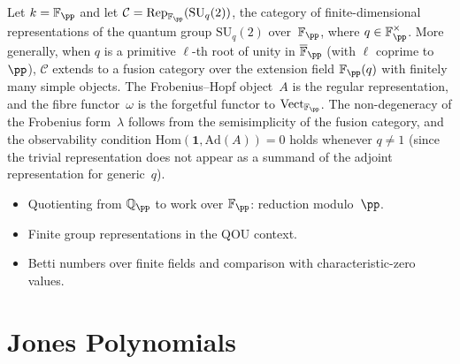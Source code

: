 \begin{example}
\label{ex:finite-field-realisation}
Let $k = \mathbb{F}_\pp$ and let $\mathcal{C} =
\mathrm{Rep}_{\mathbb{F}_\pp}(\mathrm{SU}_q(2))$, the category of
finite-dimensional representations of the quantum group
$\mathrm{SU}_q(2)$ over~$\mathbb{F}_\pp$, where $q \in
\mathbb{F}_\pp^{\times}$.  More generally, when $q$ is a primitive
$\ell$-th root of unity in $\overline{\mathbb{F}}_\pp$ (with $\ell$
coprime to~$\pp$), $\mathcal{C}$ extends to a fusion category over the
extension field $\mathbb{F}_\pp(q)$ with finitely many simple objects.
The Frobenius--Hopf object~$A$ is the regular representation, and
the fibre functor~$\omega$ is the forgetful functor to
$\mathrm{Vect}_{\mathbb{F}_\pp}$.  The non-degeneracy of the
Frobenius form~$\lambda$ follows from the semisimplicity of the fusion
category, and the observability condition
$\mathrm{Hom}(\mathbf{1}, \mathrm{Ad}(A)) = 0$ holds whenever $q \neq 1$
(since the trivial representation does not appear as a summand of the
adjoint representation for generic~$q$).
\end{example}

\begin{itemize}
  \item Quotienting from $\mathbb{Q}_\pp$ to work over $\mathbb{F}_\pp$:
        reduction modulo~$\pp$.
  \item Finite group representations in the QOU context.
  \item Betti numbers over finite fields and comparison with characteristic-zero
        values.
\end{itemize}


\section{Jones Polynomials}
\label{sec:jones-polynomials}

